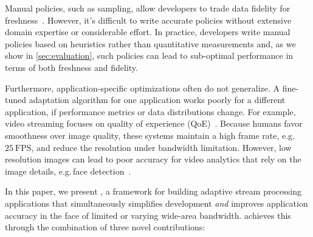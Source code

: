 Manual policies, such as sampling, allow developers to trade data fidelity for
freshness~\cite{rabkin2014aggregation}. However, it's difficult to write
accurate policies without extensive domain expertise or considerable effort. In
practice, developers write manual policies based on heuristics rather than
quantitative measurements and, as we show in \autoref{sec:evaluation}, such
policies can lead to sub-optimal performance in terms of both freshness and
fidelity.

Furthermore, application-specific optimizations often do not generalize. A
fine-tuned adaptation algorithm for one application works poorly for a different
application, if performance metrics or data distributions change.  For example,
video streaming focuses on quality of experience
(QoE)~\cite{michalos2012dynamic, pantos2016http, yin2015control}. Because humans
favor smoothness over image quality, these systems maintain a high frame rate,
e.g.\,\(25~\text{FPS}\), and reduce the resolution under bandwidth limitation.
However, low resolution images can lead to poor accuracy for video analytics
that rely on the image details, e.g.\,face detection~\cite{viola2001rapid}.

In this paper, we present \sysname{}, a framework for building adaptive stream
processing applications that simultaneously simplifies development \emph{and}
improves application accuracy in the face of limited or varying wide-area
bandwidth.
\sysname{} achieves this through the combination of three novel contributions:

